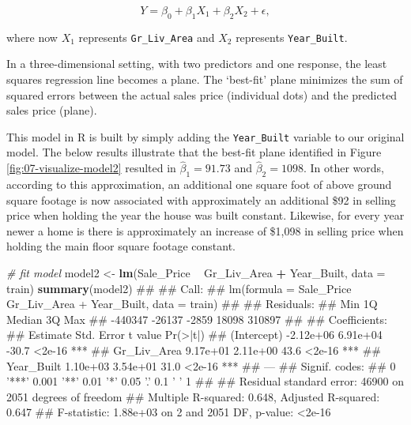 \documentclass[]{book}
\newenvironment{Shaded}{\begin{snugshade}}{\end{snugshade}}
\newcommand{\CommentTok}[1]{\textcolor[rgb]{0.56,0.35,0.01}{\textit{#1}}}
\newcommand{\DataTypeTok}[1]{\textcolor[rgb]{0.13,0.29,0.53}{#1}}
\newcommand{\KeywordTok}[1]{\textcolor[rgb]{0.13,0.29,0.53}{\textbf{#1}}}
\newcommand{\NormalTok}[1]{#1}
\newcommand{\OperatorTok}[1]{\textcolor[rgb]{0.81,0.36,0.00}{\textbf{#1}}}
\newcommand{\StringTok}[1]{\textcolor[rgb]{0.31,0.60,0.02}{#1}}
\theoremstyle{definition}
\theoremstyle{definition}
\theoremstyle{definition}
\theoremstyle{remark}
\begin{document}
\begin{equation}
\label{eq:mlm}
  Y = \beta_0 + \beta_1 X_1 + \beta_2 X_2 + \epsilon,
\end{equation}

where now \(X_1\) represents \texttt{Gr\_Liv\_Area} and \(X_2\)
represents \texttt{Year\_Built}.

\hypertarget{htmlwidget-03b1e4a11bebac26bef1}{}

\label{fig:07-visualize-model2}In a three-dimensional setting, with two
predictors and one response, the least squares regression line becomes a
plane. The `best-fit' plane minimizes the sum of squared errors between
the actual sales price (individual dots) and the predicted sales price
(plane).

This model in R is built by simply adding the \texttt{Year\_Built}
variable to our original model. The below results illustrate that the
best-fit plane identified in Figure \ref{fig:07-visualize-model2}
resulted in \(\hat \beta_1 = 91.73\) and \(\hat \beta_2 = 1098\). In
other words, according to this approximation, an additional one square
foot of above ground square footage is now associated with approximately
an additional \$92 in selling price when holding the year the house was
built constant. Likewise, for every year newer a home is there is
approximately an increase of \$1,098 in selling price when holding the
main floor square footage constant.

\begin{Shaded}
\begin{Highlighting}[]
\CommentTok{# fit model}
\NormalTok{model2 <-}\StringTok{ }\KeywordTok{lm}\NormalTok{(Sale_Price }\OperatorTok{~}\StringTok{ }\NormalTok{Gr_Liv_Area }\OperatorTok{+}\StringTok{ }\NormalTok{Year_Built, }\DataTypeTok{data =}\NormalTok{ train)}
\KeywordTok{summary}\NormalTok{(model2)}
\NormalTok{## }
\NormalTok{## Call:}
\NormalTok{## lm(formula = Sale_Price ~ Gr_Liv_Area + Year_Built, data = train)}
\NormalTok{## }
\NormalTok{## Residuals:}
\NormalTok{##     Min      1Q  Median      3Q     Max }
\NormalTok{## -440347  -26137   -2859   18098  310897 }
\NormalTok{## }
\NormalTok{## Coefficients:}
\NormalTok{##              Estimate Std. Error t value Pr(>|t|)    }
\NormalTok{## (Intercept) -2.12e+06   6.91e+04   -30.7   <2e-16 ***}
\NormalTok{## Gr_Liv_Area  9.17e+01   2.11e+00    43.6   <2e-16 ***}
\NormalTok{## Year_Built   1.10e+03   3.54e+01    31.0   <2e-16 ***}
\NormalTok{## ---}
\NormalTok{## Signif. codes:  }
\NormalTok{## 0 '***' 0.001 '**' 0.01 '*' 0.05 '.' 0.1 ' ' 1}
\NormalTok{## }
\NormalTok{## Residual standard error: 46900 on 2051 degrees of freedom}
\NormalTok{## Multiple R-squared:  0.648,  Adjusted R-squared:  0.647 }
\NormalTok{## F-statistic: 1.88e+03 on 2 and 2051 DF,  p-value: <2e-16}
\end{Highlighting}
\end{Shaded}
\end{document}
